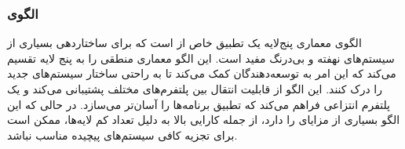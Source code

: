 \subsubsection{الگوی }
\label{arch5LayerSec}
\begin{RTL}
الگوی معماری پنج‌لایه \cite{ref4} یک تطبیق
خاص از  است
که برای ساختاردهی بسیاری از سیستم‌های نهفته و بی‌درنگ
مفید است. این الگو معماری منطقی را به پنج لایه
تقسیم می‌کند که این امر به توسعه‌دهندگان کمک می‌کند
تا به راحتی ساختار سیستم‌های جدید را درک کنند.
این الگو از قابلیت انتقال بین پلتفرم‌های مختلف پشتیبانی
می‌کند و یک پلتفرم انتزاعی فراهم می‌کند که تطبیق برنامه‌ها
را آسان‌تر می‌سازد. در حالی که این الگو بسیاری از
مزایای  را دارد، از جمله کارایی بالا به دلیل تعداد
کم لایه‌ها، ممکن است برای تجزیه کافی سیستم‌های پیچیده مناسب نباشد.
\end{RTL}